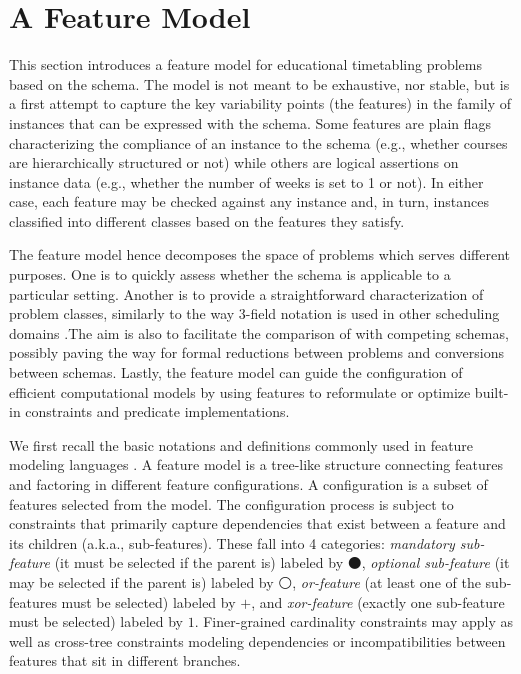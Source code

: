 \documentclass[runningheads]{llncs}
\begin{document}
  \section{A Feature Model}
\label{sec:feature-model}
This section introduces a feature model
for educational timetabling problems
based on the \UTP{} schema.
The model is not meant to be exhaustive, nor stable,
but is a first attempt
to capture the key variability points  (the features)
in the family of instances
that can be expressed with the schema.
Some features are plain flags characterizing the compliance of an instance to the schema (e.g., whether courses are hierarchically structured or not)
while others are logical assertions on instance data (e.g., whether the number of weeks is set to 1 or not).
In either case, each feature may be checked against any instance
and, in turn, instances classified into different classes
based on the features they satisfy.

The feature model hence decomposes the space of \UTP{} problems
which serves different purposes.
One is to quickly assess whether 
the schema 
is applicable to a particular setting. Another is to provide a straightforward characterization of problem classes,
similarly to the way 3-field notation is used in other scheduling domains \cite{1979_graham_ADM,robinX_3field,scheduling_zoo}.The aim is also to facilitate the comparison of \UTP{} with competing schemas, possibly paving the way for formal reductions between problems
and conversions between schemas.
Lastly, the feature model can guide the configuration of efficient computational models
by using features to reformulate or optimize built-in constraints and predicate implementations.




We first recall the basic
notations 
and definitions commonly used in feature modeling languages \cite{1990_kang_TR,2002_czarnecki_ECOOP,2019_damir_ACM}.
A feature model is a tree-like structure connecting features
and factoring in different feature configurations.
A configuration is a subset of features
selected from the model.
The configuration process is subject to constraints 
that primarily capture dependencies that 
exist between a feature and its children (a.k.a., sub-features). 
These fall into 4 categories:
\textit{mandatory sub-feature} (it must be selected if the parent is) labeled by $\medbullet$,
\textit{optional sub-feature} (it may be selected if the parent is) labeled by $\medcirc$,
\textit{or-feature} (at least one of the sub-features must be selected) labeled by $+$, 
and \textit{xor-feature} (exactly one sub-feature must be selected) labeled by $1$.
Finer-grained cardinality constraints may apply
as well as cross-tree constraints modeling dependencies or incompatibilities 
between features that sit in different branches.
\end{document}
